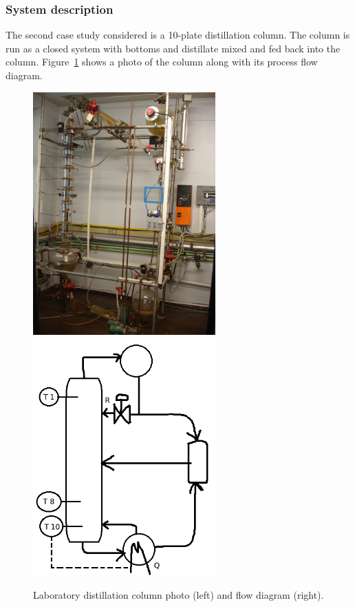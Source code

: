 \subsubsection{System description}
The second case study considered is a 10-plate distillation column.
The column is run as a closed system with bottoms and distillate mixed and fed back into the column.
Figure~\ref{fig:columnphoto} shows a photo of the column along with its process flow diagram.
\begin{figure}[htbp]
  \centering
    \includegraphics[width=7cm]{graph/columnphoto}
    \qquad
    \includegraphics[width=7cm]{graph/columnpfd}
  \caption[Laboratory distillation column photo and flow diagram]{Laboratory distillation column photo (left) and flow diagram (right).}
  \label{fig:columnphoto}
\end{figure}

